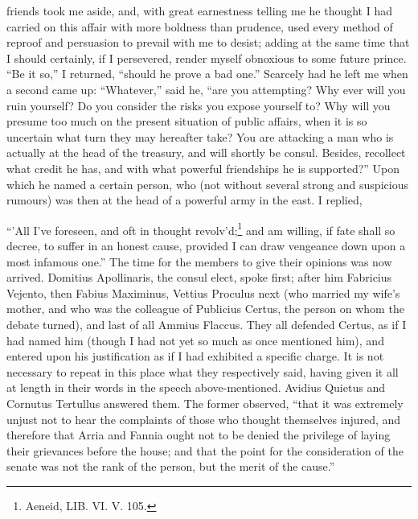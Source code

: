 friends took me aside, and, with great earnestness telling me he thought I
had carried on this affair with more boldness than prudence, used every
method of reproof and persuasion to prevail with me to desist; adding at
the same time that I should certainly, if I persevered, render myself
obnoxious to some future prince. ``Be it so,'' I returned, ``should he prove
a bad one.'' Scarcely had he left me when a second came up: ``Whatever,''
said he, ``are you attempting? Why ever will you ruin yourself? Do you
consider the risks you expose yourself to? Why will you presume too much
on the present situation of public affairs, when it is so uncertain what
turn they may hereafter take? You are attacking a man who is actually at
the head of the treasury, and will shortly be consul. Besides, recollect
what credit he has, and with what powerful friendships he is supported?''
Upon which he named a certain person, who (not without several strong and
suspicious rumours) was then at the head of a powerful army in the east. I
replied,

``'All I've foreseen, and oft in thought revolv'd;\footnote{Aeneid, LIB. VI. V.
105.} and am willing, if
fate shall so decree, to suffer in an honest cause, provided I can draw
vengeance down upon a most infamous one.'' The time for the members to give
their opinions was now arrived. Domitius Apollinaris, the consul elect,
spoke first; after him Fabricius Vejento, then Fabius Maximinus, Vettius
Proculus next (who married my wife's mother, and who was the colleague of
Publicius Certus, the person on whom the debate turned), and last of all
Ammius Flaccus. They all defended Certus, as if I had named him (though I
had not yet so much as once mentioned him), and entered upon his
justification as if I had exhibited a specific charge. It is not necessary
to repeat in this place what they respectively said, having given it all
at length in their words in the speech above-mentioned. Avidius Quietus
and Cornutus Tertullus answered them. The former observed, ``that it was
extremely unjust not to hear the complaints of those who thought
themselves injured, and therefore that Arria and Fannia ought not to be
denied the privilege of laying their grievances before the house; and that
the point for the consideration of the senate was not the rank of the
person, but the merit of the cause.''


